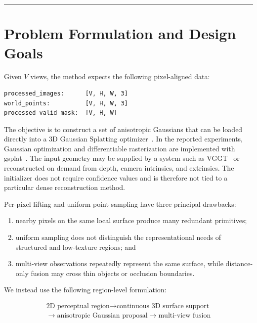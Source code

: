 \documentclass[11pt,a4paper]{article}
\begin{document}
\medskip
\noindent\rule{\textwidth}{0.5pt}
\medskip

\section{Problem Formulation and Design Goals}

Given $V$ views, the method expects the following pixel-aligned data:

\begin{lstlisting}[style=reportcode]
processed_images:      [V, H, W, 3]
world_points:          [V, H, W, 3]
processed_valid_mask:  [V, H, W]
\end{lstlisting}

The objective is to construct a set of anisotropic Gaussians that can be loaded directly into a 3D Gaussian Splatting optimizer~\cite{kerbl2023gaussians}. In the reported experiments, Gaussian optimization and differentiable rasterization are implemented with gsplat~\cite{ye2025gsplat}. The input geometry may be supplied by a system such as VGGT~\cite{wang2025vggt} or reconstructed on demand from depth, camera intrinsics, and extrinsics. The initializer does not require confidence values and is therefore not tied to a particular dense reconstruction method.

Per-pixel lifting and uniform point sampling have three principal drawbacks:

\begin{enumerate}
  \item nearby pixels on the same local surface produce many redundant primitives;
  \item uniform sampling does not distinguish the representational needs of structured and low-texture regions; and
  \item multi-view observations repeatedly represent the same surface, while distance-only fusion may cross thin objects or occlusion boundaries.
\end{enumerate}

We instead use the following region-level formulation:

\begin{equation}
\boxed{
\begin{gathered}
\text{2D perceptual region}\rightarrow\text{continuous 3D surface support}\\
\rightarrow\text{anisotropic Gaussian proposal}\rightarrow\text{multi-view fusion}
\end{gathered}}
\label{eq:pipeline}
\end{equation}
\end{document}
